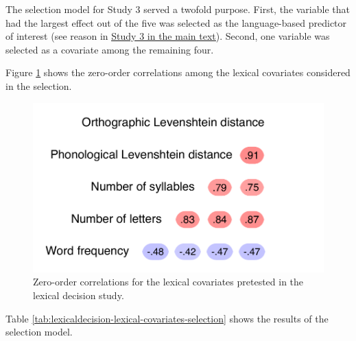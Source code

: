 \documentclass[
  12pt,
  man,floatsintext]{apa7}
\begin{document}
The selection model for Study 3 served a twofold purpose. First, the variable that had the largest effect out of the five was selected as the language-based predictor of interest (see reason in \protect\hyperlink{lexicaldecision}{\underline{Study 3 in the main text}}). Second, one variable was selected as a covariate among the remaining four.

Figure \ref{fig:lexicaldecision-lexical-covariates-correlations} shows the zero-order correlations among the lexical covariates considered in the selection.

\begin{figure}

{\centering \includegraphics[width=0.5\linewidth]{thesis-core_files/figure-latex/lexicaldecision-lexical-covariates-correlations-1} 

}

\caption{Zero-order correlations for the lexical covariates pretested in the lexical decision study.}\label{fig:lexicaldecision-lexical-covariates-correlations}
\end{figure}

Table \ref{tab:lexicaldecision-lexical-covariates-selection} shows the results of the selection model.
\end{document}
